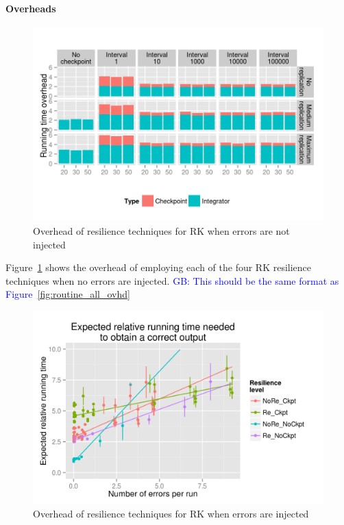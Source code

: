 \documentclass{sig-alternate}
\newcommand{\greg}[1]{%
  \textcolor{blue}{GB: #1}
}
\begin{document}
\paragraph{Overheads}

\begin{figure}[ht!]
\centering
\includegraphics[width=1.00\columnwidth]{figs/4_1_1_Overall_Breakdown_RK4}
\caption{Overhead of resilience techniques for RK when errors are not injected}
\label{fig:rk_routine_detect_ovhd}
\end{figure}

Figure~\ref{fig:rk_routine_detect_ovhd} shows the overhead of employing each of the four RK resilience techniques when no errors are injected. \greg{This should be the same format as Figure~\ref{fig:routine_all_ovhd}} 

\begin{figure}[ht!]
\centering
\includegraphics[width=1.00\columnwidth]{figs/4_1_2_Exp2_Expected_Running_Time_Needed.png}
\caption{Overhead of resilience techniques for RK when errors are injected}
\label{fig:rk_routine_exp_exec}
\end{figure}
\end{document}
